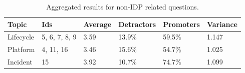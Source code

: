 \documentclass[a4paper,12pt]{article}
\begin{document}
    \begin{table}[!htbp]
        \begin{center}
            \begin{tabularx}{\textwidth}{llllll}
                \toprule
                Topic     & Ids           & Average & Detractors & Promoters & Variance \\
                \midrule
                Lifecycle & 5, 6, 7, 8, 9 & 3.59    & 13.9\%     & 59.5\%    & 1.147    \\
                Platform  & 4, 11, 16     & 3.46    & 15.6\%     & 54.7\%    & 1.025    \\
                Incident  & 15            & 3.92    & 10.7\%     & 74.7\%    & 1.099    \\
                \bottomrule
            \end{tabularx}
        \end{center}
        \caption{\label{tab:nonidpresults} Aggregated results for non-IDP related questions.}
    \end{table}
\end{document}
